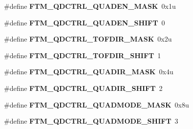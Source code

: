 \begin{DoxyCompactItemize}
\item 
\hypertarget{group___f_t_m___register___masks_ga130e81d72e324d2e47e6613071606c4c}{}\#define {\bfseries F\+T\+M\+\_\+\+Q\+D\+C\+T\+R\+L\+\_\+\+Q\+U\+A\+D\+E\+N\+\_\+\+M\+A\+S\+K}~0x1u\label{group___f_t_m___register___masks_ga130e81d72e324d2e47e6613071606c4c}

\item 
\hypertarget{group___f_t_m___register___masks_gae39df93f832b0d790301964418e74938}{}\#define {\bfseries F\+T\+M\+\_\+\+Q\+D\+C\+T\+R\+L\+\_\+\+Q\+U\+A\+D\+E\+N\+\_\+\+S\+H\+I\+F\+T}~0\label{group___f_t_m___register___masks_gae39df93f832b0d790301964418e74938}

\item 
\hypertarget{group___f_t_m___register___masks_ga0bab5d224dd3ac34bd2c827f96c60b14}{}\#define {\bfseries F\+T\+M\+\_\+\+Q\+D\+C\+T\+R\+L\+\_\+\+T\+O\+F\+D\+I\+R\+\_\+\+M\+A\+S\+K}~0x2u\label{group___f_t_m___register___masks_ga0bab5d224dd3ac34bd2c827f96c60b14}

\item 
\hypertarget{group___f_t_m___register___masks_ga6d666900b5d312877cc343dbc58969b0}{}\#define {\bfseries F\+T\+M\+\_\+\+Q\+D\+C\+T\+R\+L\+\_\+\+T\+O\+F\+D\+I\+R\+\_\+\+S\+H\+I\+F\+T}~1\label{group___f_t_m___register___masks_ga6d666900b5d312877cc343dbc58969b0}

\item 
\hypertarget{group___f_t_m___register___masks_gac6c87f5278eaf7f6c4121ec5a3b316a5}{}\#define {\bfseries F\+T\+M\+\_\+\+Q\+D\+C\+T\+R\+L\+\_\+\+Q\+U\+A\+D\+I\+R\+\_\+\+M\+A\+S\+K}~0x4u\label{group___f_t_m___register___masks_gac6c87f5278eaf7f6c4121ec5a3b316a5}

\item 
\hypertarget{group___f_t_m___register___masks_ga31c6ba1b172d97e71ecd42ce6a8978ed}{}\#define {\bfseries F\+T\+M\+\_\+\+Q\+D\+C\+T\+R\+L\+\_\+\+Q\+U\+A\+D\+I\+R\+\_\+\+S\+H\+I\+F\+T}~2\label{group___f_t_m___register___masks_ga31c6ba1b172d97e71ecd42ce6a8978ed}

\item 
\hypertarget{group___f_t_m___register___masks_gaaee693e052290f94ba226027a39f3bbd}{}\#define {\bfseries F\+T\+M\+\_\+\+Q\+D\+C\+T\+R\+L\+\_\+\+Q\+U\+A\+D\+M\+O\+D\+E\+\_\+\+M\+A\+S\+K}~0x8u\label{group___f_t_m___register___masks_gaaee693e052290f94ba226027a39f3bbd}

\item 
\hypertarget{group___f_t_m___register___masks_ga70e29e6856263443f9415464e8c88d35}{}\#define {\bfseries F\+T\+M\+\_\+\+Q\+D\+C\+T\+R\+L\+\_\+\+Q\+U\+A\+D\+M\+O\+D\+E\+\_\+\+S\+H\+I\+F\+T}~3\label{group___f_t_m___register___masks_ga70e29e6856263443f9415464e8c88d35}


\end{DoxyCompactItemize}
